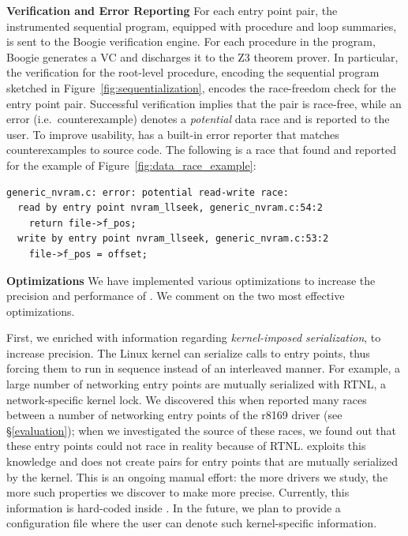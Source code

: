 \noindent\textbf{Verification and Error Reporting }
%
For each entry point pair, the instrumented sequential program, equipped with procedure and loop summaries, is sent to the Boogie verification engine. For each procedure in the program, Boogie generates a VC and discharges it to the Z3 theorem prover.  In particular, the verification for the root-level procedure, encoding the sequential program sketched in Figure~\ref{fig:sequentialization}, encodes the race-freedom check for the entry point pair. Successful verification implies that the pair is race-free, while an error (i.e.\ counterexample) denotes a \emph{potential} data race and is reported to the user. To improve usability, \whoop has a built-in error reporter that matches counterexamples to source code. The following is a race that \whoop found and reported for the example of Figure~\ref{fig:data_race_example}: 

\begin{lstlisting}[keywordstyle=\ttfamily]
generic_nvram.c: error: potential read-write race:
  read by entry point nvram_llseek, generic_nvram.c:54:2
    return file->f_pos;
  write by entry point nvram_llseek, generic_nvram.c:53:2
    file->f_pos = offset;
\end{lstlisting}

\noindent\textbf{Optimizations }
%
We have implemented various optimizations to increase the precision and performance of \whoop.  We comment on the two most effective optimizations.

First, we enriched \whoop with information regarding \emph{kernel-imposed serialization}, to increase precision. The Linux kernel can serialize calls to entry points, thus forcing them to run in sequence instead of an interleaved manner. For example, a large number of networking entry points are mutually serialized with RTNL, a network-specific kernel lock. We discovered this when \whoop reported many races between a number of networking entry points of the r8169 driver (see \S\ref{evaluation}); when we investigated the source of these races, we found out that these entry points could not race in reality because of RTNL. \whoop exploits this knowledge and does not create pairs for entry points that are mutually serialized by the kernel. This is an ongoing manual effort: the more drivers we study, the more such properties we discover to make \whoop more precise. Currently, this information is hard-coded inside \whoop. In the future, we plan to provide a configuration file where the user can denote such kernel-specific information.


